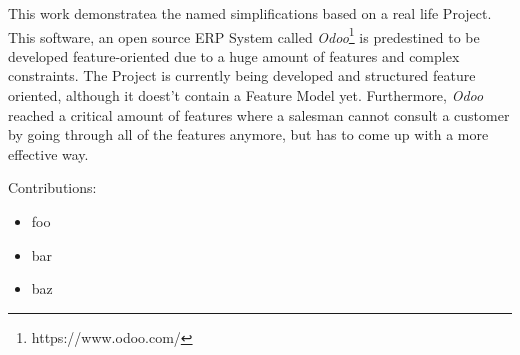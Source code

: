 This work demonstratea the named simplifications based on a real life Project. This software, an open source ERP System called \textit{Odoo}\footnote{https://www.odoo.com/} is predestined to be developed feature-oriented due to a huge amount of features and complex constraints. The Project is currently being developed and structured feature oriented, although it doest't contain a Feature Model yet. Furthermore, \textit{Odoo} reached a critical amount of features where a salesman cannot consult a customer by going through all of the features anymore, but has to come up with a more effective way.

Contributions:
\begin{itemize}
\item foo
\item bar
\item baz
\end{itemize}